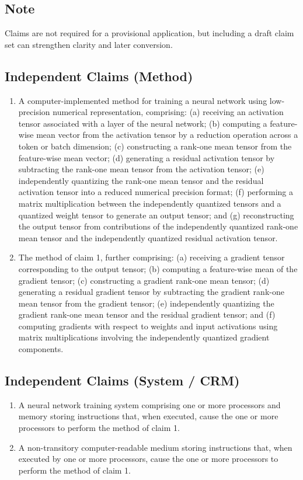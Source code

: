\documentclass[11pt]{article}
\begin{document}
\subsection*{Note}
Claims are not required for a provisional application, but including a draft claim set can strengthen clarity and later conversion.

\subsection{Independent Claims (Method)}
\begin{enumerate}[leftmargin=1.3em]
\item A computer-implemented method for training a neural network using low-precision numerical representation, comprising:
(a) receiving an activation tensor associated with a layer of the neural network;
(b) computing a feature-wise mean vector from the activation tensor by a reduction operation across a token or batch dimension;
(c) constructing a rank-one mean tensor from the feature-wise mean vector;
(d) generating a residual activation tensor by subtracting the rank-one mean tensor from the activation tensor;
(e) independently quantizing the rank-one mean tensor and the residual activation tensor into a reduced numerical precision format;
(f) performing a matrix multiplication between the independently quantized tensors and a quantized weight tensor to generate an output tensor; and
(g) reconstructing the output tensor from contributions of the independently quantized rank-one mean tensor and the independently quantized residual activation tensor.

\item The method of claim 1, further comprising:
(a) receiving a gradient tensor corresponding to the output tensor;
(b) computing a feature-wise mean of the gradient tensor;
(c) constructing a gradient rank-one mean tensor;
(d) generating a residual gradient tensor by subtracting the gradient rank-one mean tensor from the gradient tensor;
(e) independently quantizing the gradient rank-one mean tensor and the residual gradient tensor; and
(f) computing gradients with respect to weights and input activations using matrix multiplications involving the independently quantized gradient components.
\end{enumerate}

\subsection{Independent Claims (System / CRM)}
\begin{enumerate}[leftmargin=1.3em, resume]
\item A neural network training system comprising one or more processors and memory storing instructions that, when executed, cause the one or more processors to perform the method of claim 1.

\item A non-transitory computer-readable medium storing instructions that, when executed by one or more processors, cause the one or more processors to perform the method of claim 1.
\end{enumerate}
\end{document}
